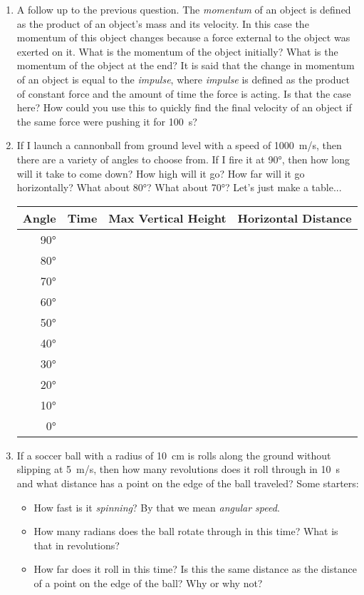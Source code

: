 \begin{enumerate}
\item 
A follow up to the previous question. The \emph{momentum} of an object is defined as the product of an object's mass and its velocity. In this case the momentum of this object changes because a force external to the object was exerted on it. What is the momentum of the object initially? What is the momentum of the object at the end? It is said that the change in momentum of an object is equal to the \emph{impulse}, where \emph{impulse} is defined as the product of constant force and the amount of time the force is acting. Is that the case here? How could you use this to quickly find the final velocity of an object if the same force were pushing it for \SI{100}{\second}?
\hugeskip

\item 
If I launch a cannonball from ground level with a speed of \SI{1000}{m/s}, then there are a variety of angles to choose from. If I fire it at \ang{90}, then how long will it take to come down? How high will it go? How far will it go horizontally? What about \ang{80}? What about \ang{70}? Let's just make a table...

\begin{tabular}{rrrr}
	\toprule
	Angle & Time & Max Vertical Height & Horizontal Distance \\
	\midrule
	\midrule
	\ang{90} \\
	\ang{80} \\
	\ang{70} \\
	\ang{60} \\
	\ang{50} \\
	\ang{40} \\
	\ang{30} \\
	\ang{20} \\
	\ang{10} \\
	\ang{0} \\
	\bottomrule
\end{tabular}

\item If a soccer ball with a radius of \SI{10}{\centi\meter} is rolls along the ground without slipping at \SI{5}{m/s}, then how many revolutions does it roll through in \SI{10}{\second} and what distance has a point on the edge of the ball traveled?
Some starters:
\begin{itemize}
	\item How fast is it \emph{spinning}? By that we mean \emph{angular speed}.
	\item How many radians does the ball rotate through in this time? What is that in revolutions?
	\item How far does it roll in this time? Is this the same distance as the distance of a point on the edge of the ball? Why or why not?
\end{itemize}
\hugeskip


\end{enumerate}
